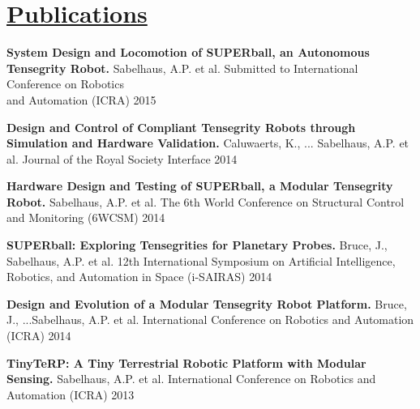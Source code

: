 \documentclass[12pt,letterpaper]{deedy-resume} %
\begin{document}
\begin{minipage}[t][6.8in][t]{0.66\textwidth}%
\raggedright{

\hspace{-2in}

\section{\quad \underline{Publications}}

\vspace{0.4cm}

\begin{tightitemize}

\item \textbf{System Design and Locomotion of SUPERball, an Autonomous Tensegrity Robot.} Sabelhaus, A.P. et al. Submitted to International Conference on Robotics \\and Automation (ICRA) 2015

\item \textbf{Design and Control of Compliant Tensegrity Robots through Simulation and Hardware Validation.} Caluwaerts, K., ... Sabelhaus, A.P. et al. Journal of the Royal Society Interface 2014

\item \textbf{Hardware Design and Testing of SUPERball, a Modular Tensegrity Robot.} Sabelhaus, A.P. et al. The 6th World Conference on Structural Control and Monitoring (6WCSM) 2014

\item \textbf{SUPERball: Exploring Tensegrities for Planetary Probes.} Bruce, J., Sabelhaus, A.P. et al. 12th International Symposium on Artificial Intelligence, Robotics, and Automation in Space (i-SAIRAS) 2014

\item \textbf{Design and Evolution of a Modular Tensegrity Robot Platform.} Bruce, J., ...Sabelhaus, A.P. et al. International Conference on Robotics and Automation (ICRA) 2014

\item \textbf{TinyTeRP: A Tiny Terrestrial Robotic Platform with Modular Sensing.} Sabelhaus, A.P. et al. International Conference on Robotics and Automation (ICRA) 2013 


\end{tightitemize}}
\end{minipage}
\end{document}
